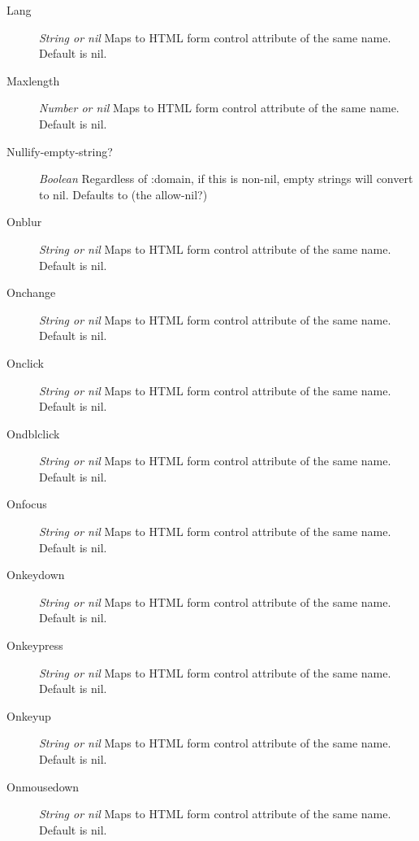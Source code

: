 \documentclass [11pt]{book}
\begin{document}
\begin{itemize}
\begin{description}
\item [Lang]
\emph{String or nil} Maps to HTML form control attribute of the same name. Default is nil.


\item [Maxlength]
\emph{Number or nil} Maps to HTML form control attribute of the same name. Default is nil.


\item [Nullify-empty-string?]
\emph{Boolean} Regardless of :domain, if this is non-nil, empty strings will convert to nil. Defaults to (the allow-nil?)


\item [Onblur]
\emph{String or nil} Maps to HTML form control attribute of the same name. Default is nil.


\item [Onchange]
\emph{String or nil} Maps to HTML form control attribute of the same name. Default is nil.


\item [Onclick]
\emph{String or nil} Maps to HTML form control attribute of the same name. Default is nil.


\item [Ondblclick]
\emph{String or nil} Maps to HTML form control attribute of the same name. Default is nil.


\item [Onfocus]
\emph{String or nil} Maps to HTML form control attribute of the same name. Default is nil.


\item [Onkeydown]
\emph{String or nil} Maps to HTML form control attribute of the same name. Default is nil.


\item [Onkeypress]
\emph{String or nil} Maps to HTML form control attribute of the same name. Default is nil.


\item [Onkeyup]
\emph{String or nil} Maps to HTML form control attribute of the same name. Default is nil.


\item [Onmousedown]
\emph{String or nil} Maps to HTML form control attribute of the same name. Default is nil.



\end{description}
\end{itemize}
\end{document}
